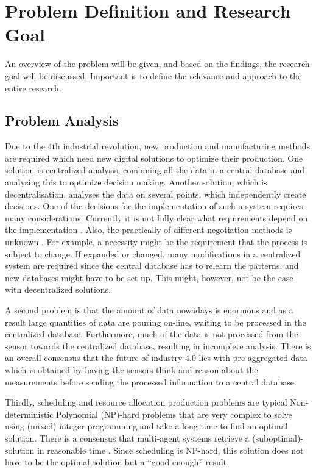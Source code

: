 \chapter{Problem Definition and Research Goal}
\label{chp:problem}
An overview of the problem will be given, and based on the findings, the research goal will be discussed. Important is to define the relevance and approach to the entire research. 
\section{Problem Analysis}
Due to the 4th industrial revolution, new production and manufacturing methods are required which need new digital solutions to optimize their production. One solution is centralized analysis, combining all the data in a central database and analysing this to optimize decision making. Another solution, which is decentralisation, analyses the data on several points, which independently create decisions. One of the decisions for the implementation of such a system requires many considerations. Currently it is not fully clear what requirements depend on the implementation \citep{leitao2016smart}. Also, the practically of different negotiation methods is unknown \citep{fatima2014principles}. For example, a necessity might be the requirement that the process is subject to change. If expanded or changed, many modifications in a centralized system are required since the central database has to relearn the patterns, and new databases might have to be set up. This might, however, not be the case with decentralized solutions. %

A second problem is that the amount of data nowadays is enormous and as a result large quantities of data are pouring on-line, waiting to be processed in the centralized database. Furthermore, much of the data is not processed from the sensor towards the centralized database, resulting in incomplete analysis. There is an overall consensus that the future of industry 4.0 lies with pre-aggregated data \citep{deloitte2015connected} which is obtained by having the sensors think and reason about the measurements before sending the processed information to a central database.

Thirdly, scheduling and resource allocation production problems are typical Non-deterministic Polynomial (NP)-hard problems that are very complex to solve using (mixed) integer programming and take a long time to find an optimal solution. There is a consensus that multi-agent systems retrieve a (suboptimal)-solution in reasonable time \citep{konolige1980multiple}. Since scheduling is NP-hard, this solution does not have to be the optimal solution but a ``good enough'' result.  

